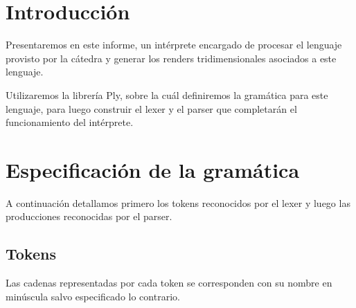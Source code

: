 \documentclass[a4paper, 10pt, twoside]{article}
\begin{document}
\newpage




\section{Introducción}
Presentaremos en este informe, un intérprete encargado de procesar el lenguaje provisto por la cátedra y generar los renders tridimensionales asociados a este lenguaje.

Utilizaremos la librería Ply, sobre la cuál definiremos la gramática para este lenguaje, para luego construir el lexer y el parser que completarán el funcionamiento del intérprete.


\section{Especificación de la gramática}

A continuación detallamos primero los tokens reconocidos por el lexer y luego las producciones reconocidas por el parser.


\subsection{Tokens}

Las cadenas representadas por cada token se corresponden con su nombre en minúscula salvo especificado lo contrario.
\end{document}
